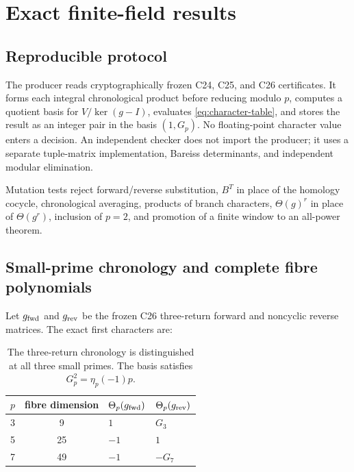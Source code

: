 \section{Exact finite-field results}
\label{sec:results}

\subsection{Reproducible protocol}

The producer reads cryptographically frozen C24, C25, and C26 certificates.
It forms each integral chronological product before reducing modulo \(p\),
computes a quotient basis for \(V/\ker(g-I)\), evaluates
\cref{eq:character-table}, and stores the result as an integer pair in the
basis \((1,G_p)\).  No floating-point character value enters a decision.
An independent checker does not import the producer; it uses a separate
tuple-matrix implementation, Bareiss determinants, and independent modular
elimination.

Mutation tests reject forward/reverse substitution, \(B^T\) in place of the
homology cocycle, chronological averaging, products of branch characters,
\(\Theta(g)^r\) in place of \(\Theta(g^r)\), inclusion of \(p=2\), and
promotion of a finite window to an all-power theorem.

\subsection{Small-prime chronology and complete fibre polynomials}

Let \(g_{\rm fwd}\) and \(g_{\rm rev}\) be the frozen C26 three-return
forward and noncyclic reverse matrices.  The exact first characters are:

\begin{table}[ht]
\centering
\caption{The three-return chronology is distinguished at all three small
primes.  The basis satisfies \(G_p^2=\eta_p(-1)p\).}
\label{tab:smallchars}
\begin{tabular}{ccll}
\toprule
\(p\) & fibre dimension & \(\Theta_p(g_{\rm fwd})\) &
\(\Theta_p(g_{\rm rev})\)\\
\midrule
3 & 9  & \(1\)  & \(G_3\)\\
5 & 25 & \(-1\) & \(1\)\\
7 & 49 & \(-1\) & \(-G_7\)\\
\bottomrule
\end{tabular}
\end{table}

